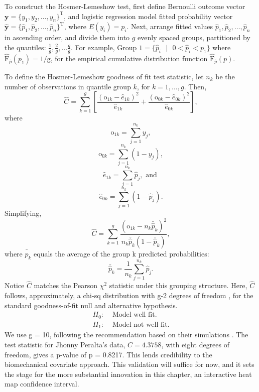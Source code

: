 To construct the Hosmer-Lemeshow test, first define Bernoulli outcome vector $\pmb{y} = \{y_{1}, y_{2}, \dots, y_{n}\}^{\text{T}}$, and logistic regression model fitted probability vector $\hat{\pmb{y}} = \{\hat{p}_{1}, \hat{p}_{2}, \dots, \hat{p}_{n}\}^{\text{T}}$, where $E(y_{i}) = p_{i}$. Next, arrange fitted values $\hat{p}_{1}, \hat{p}_{2}, \dots, \hat{p}_{n}$ in ascending order, and divide them into $g$ evenly spaced groups, partitioned by the quantiles: $\frac{1}{g}, \frac{2}{g}, \dots \frac{g}{g}$. For example, $\text{Group 1} = \{\hat{p}_{i}\text{ }|\text{ }0 < \hat{p}_{i} < p_{1}\}$ where $\hat{\text{F}}_{\hat{p}}(p_{1})=1/\text{g}$, for the empirical cumulative distribution function $\hat{\text{F}}_{\hat{p}}(p)$. 

To define the Hosmer-Lemeshow goodness of fit test statistic, let $n_{k}$ be the number of observations in quantile group $k$, for $k = 1, \dots, g$. Then,
$$ \widehat{C} = \sum_{k=1}^{g} \left[ \frac{(\text{o}_{1k}-\hat{e}_{1k})^{2}}{\hat{e}_{1k}} + \frac{(\text{o}_{0k}-\hat{e}_{0k})^{2}}{\hat{e}_{0k}}  \right], $$
where
$$ \text{o}_{1k} =  \sum_{j=1}^{n_{k}}y_{j},$$
$$ \text{o}_{0k} =  \sum_{j=1}^{n_{k}}(1-y_{j}),$$
$$ \hat{e}_{1k} = \sum_{j=1}^{n_{k}}\hat{p}_{j}, \text{ and }$$
$$ \hat{e}_{0k} = \sum_{j=1}^{n_{k}}(1-\hat{p}_{j}).$$
Simplifying, 
$$ \widehat{C} = \sum_{k=1}^{g} \frac{(\text{o}_{1k}-n_{k}\bar{\hat{p}}_{k})^{2}}{n_{k}\bar{\hat{p}}_{k}(1-\bar{\hat{p}}_{k})},$$
where $\bar{\hat{p}}_{k}$ equals the average of the group k predicted probabilities:
$$\bar{\hat{p}}_{k} = \frac{1}{n_{k}}\sum_{j=1}^{n_{k}}\hat{p}_{j}.$$
Notice $\widehat{C}$ matches the Pearson $\chi^{2}$ statistic under this grouping structure. Here, $\widehat{C}$ follows, approximately, a chi-sq distribution with g-2 degrees of freedom \citep{Hosmer1980}, for the standard goodness-of-fit null and alternative hypothesis.
\begin{align}
H_{0}: & \text{ Model well fit.} \\
H_{1}: & \text{ Model not well fit.}
\end{align}
We use g = 10, following the \cite{Hosmer2013} recommendation based on their simulations \citep{Hosmer1980}. The test statistic for Jhonny Peralta's data, $\widehat{C} = 4.3758$, with eight degrees of freedom, gives a p-value of p = 0.8217. This lends credibility to the biomechanical covariate approach. This validation will suffice for now, and it sets the stage for the more substantial innovation in this chapter, an interactive heat map confidence interval.

